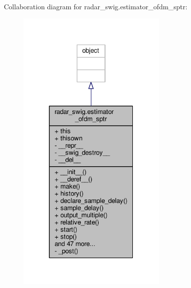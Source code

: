 Collaboration diagram for radar\+\_\+swig.\+estimator\+\_\+ofdm\+\_\+sptr\+:
\nopagebreak
\begin{figure}[H]
\begin{center}
\leavevmode
\includegraphics[width=208pt]{d7/d43/classradar__swig_1_1estimator__ofdm__sptr__coll__graph}
\end{center}
\end{figure}

